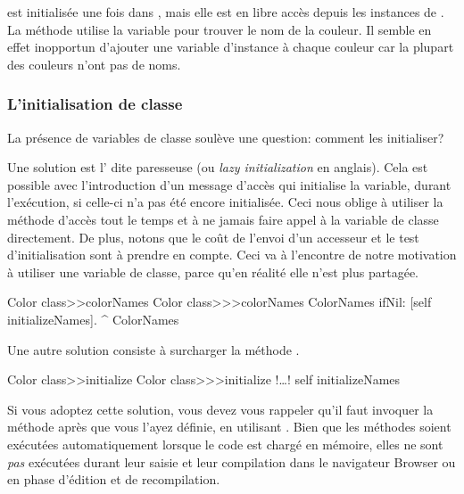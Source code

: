 \documentclass[a4paper,10pt,twoside]{book}
\begin{document}

 est initialisée une fois dans , mais elle est en libre accès depuis les instances de .
La méthode  utilise la variable pour trouver
le nom de la couleur.
Il semble en effet inopportun d'ajouter une variable d'instance 
à chaque couleur car la plupart des couleurs n'ont pas de noms.
 
\subsubsection{L'initialisation de classe}

La présence de variables de classe soulève une question: comment les initialiser?

Une solution est l' dite paresseuse (ou \emph{lazy initialization} en anglais).
Cela est possible avec l'introduction d'un message d'accès qui
initialise la variable, durant l'exécution, si celle-ci n'a pas été
encore initialisée.
Ceci nous oblige à utiliser la méthode d'accès tout le temps et à ne jamais
faire appel à la variable de classe directement.
De plus, notons que le coût de l'envoi d'un accesseur et le test d'initialisation sont à prendre en compte.
Ceci va à l'encontre de notre motivation à utiliser une variable de classe, parce qu'en réalité elle n'est plus partagée.

\begin{method}[colorclasscolornames]{Color class>>colorNames}
Color class>>>colorNames	
	ColorNames ifNil: [self initializeNames].
	^ ColorNames
\end{method}	

Une autre solution consiste à surcharger la méthode .

\begin{method}[colorclassinit]{Color class>>initialize}
Color class>>>initialize	
	!\ldots!
	self initializeNames
\end{method}

\noindent
Si vous adoptez cette solution, vous devez vous rappeler qu'il faut
invoquer la méthode  après que vous l'ayez définie,
\eg en utilisant .
Bien que les méthodes   soient exécutées automatiquement lorsque le code est chargé en mémoire,
elles ne sont \emph{pas} exécutées durant leur saisie et leur compilation dans le navigateur Browser ou en phase d'édition et de recompilation.
\end{document}
